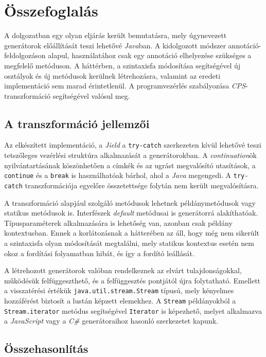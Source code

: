 \chapter{Összefoglalás}

A dolgozatban egy olyan eljárás került bemutatásra, mely úgynevezett generátorok előállítását teszi lehetővé \textit{Java}ban. A kidolgozott módszer annotáció-feldolgozáson alapul, használatához csak egy annotáció elhelyezése szükséges a megfelelő metóduson. A háttérben, a szintaxisfa módosítása segítségével új osztályok és új metódusok kerülnek létrehozásra, valamint az eredeti implementáció sem marad érintetlenül. A programvezérlés szabályozása \textit{CPS}-transzformáció segítségével valósul meg.

\section{A transzformáció jellemzői}

Az elkészített implementáció, a \textit{Jield} a \texttt{try-catch} szerkezeten kívül lehetővé teszi tetszőleges vezérlési struktúra alkalmazását a generátorokban. A \textit{continuation}ök nyilvántartásának köszönhetően a címkék és az ugrást megvalósító utasítások, a \texttt{continue} és a \texttt{break} is használhatóak bárhol, ahol a \textit{Java} megengedi. A \texttt{try-catch} transzformációja egyelőre összetettsége folytán nem került megvalósításra. 

A transzformáció alapjául szolgáló metódusok lehetnek példánymetódusok vagy statikus metódusok is. Interfészek \textit{default} metódusai is generátorrá alakíthatóak. Típusparaméterek alkalmazására is lehetőség van, azonban csak példány kontextusban. Ennek a korlátozásnak a hátterében az áll, hogy még nem sikerült a szintaxisfa olyan módosítását megtalálni, mely statikus kontextus esetén nem okoz a fordítási folyamatban hibát, és így a fordító leállását.

A létrehozott generátorok valóban rendelkeznek az elvárt tulajdonságokkal, működésük felfüggeszthető, és a felfüggesztés pontjától újra folytatható. Emellett a visszatérési értékük \texttt{java.util.stream.Stream} típusú, mely kényelmes hozzáférést biztosít a lustán képzett elemekhez. A \texttt{Stream} példányokból a \texttt{Stream.iterator} metódus segítségével \texttt{Iterator} is képezhető, melyet alkalmazva a \textit{JavaScript} vagy a \textit{C\#} generátoraihoz hasonló szerkezetet kapunk.

\section{Összehasonlítás}

